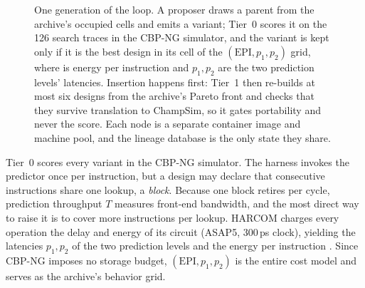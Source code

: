 \documentclass[conference]{IEEEtran}
\newcommand{\vfs}{\text{VFS}}
\newcommand{\epi}{\text{EPI}}
\begin{document}
\begin{figure}[tb]
\centering
{}
\caption{One generation of the loop. A proposer draws a parent from the
archive's occupied cells and emits a variant; Tier~0 scores it on the 126
search traces in the CBP-NG simulator, and the variant is kept only if it is
the best design in its cell of the $(\epi{},p_1,p_2)$ grid, where \epi{} is
energy per instruction and $p_1,p_2$ are the two prediction levels' latencies.
Insertion happens first: Tier~1 then re-builds at most six designs from the
archive's Pareto front and checks that they survive translation to ChampSim, so
it gates portability and never the score. Each node is a separate container
image and machine pool, and the lineage database is the only state they share.}
\label{fig:loop}
\end{figure}

Tier~0 scores every variant in the CBP-NG simulator. The harness invokes the
predictor once per instruction, but a design may declare that consecutive
instructions share one lookup, a \emph{block}. Because one block retires per
cycle, prediction throughput $T$ measures front-end bandwidth, and the most
direct way to raise it is to cover more instructions per lookup. HARCOM charges
every operation the delay and energy of its circuit (ASAP5, 300\,ps clock),
yielding the latencies $p_1,p_2$ of the two prediction levels and the energy per
instruction \epi{}. Since CBP-NG imposes no storage budget, $(\epi{},p_1,p_2)$
is the entire cost model and serves as the archive's behavior grid.
\end{document}

